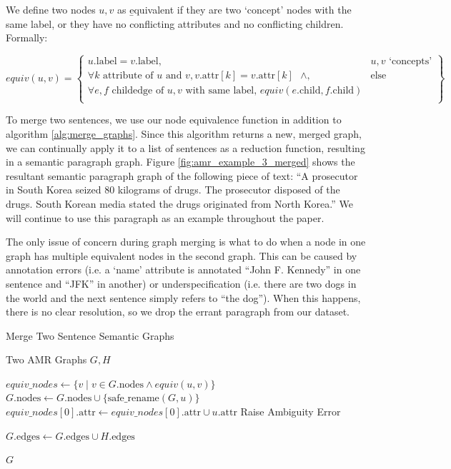 \documentclass[12pt]{article}
\begin{document}
We define two nodes $u, v$ as {\b equivalent} if they are two `concept' nodes with the same label, or they have no conflicting attributes and no conflicting children. Formally:

\[
    equiv(u,v) = \left\{\begin{array}{lr}
    u.\text{label} = v.\text{label}, & u,v \text{ `concepts'} \\
    \forall k \text{ attribute of } u \text{ and } v, v.\text{attr}[k] = v.\text{attr}[k] \text{ } \land, & \text{else} \\
    \forall e,f \text{ childedge of } u,v \text{ with same label, } equiv(e.\text{child}, f.\text{child}) & \\
    \end{array}\right\}
\]

To merge two sentences, we use our node equivalence function in addition to algorithm \ref{alg:merge_graphs}. Since this algorithm returns a new, merged graph, we can continually apply it to a list of sentences as a reduction function, resulting in a semantic paragraph graph. Figure \ref{fig:amr_example_3_merged} shows the resultant semantic paragraph graph of the following piece of text: ``A prosecutor in South Korea seized 80 kilograms of drugs. The prosecutor disposed of the drugs. South Korean media stated the drugs originated from North Korea.'' We will continue to use this paragraph as an example throughout the paper.

The only issue of concern during graph merging is what to do when a node in one graph has multiple equivalent nodes in the second graph. This can be caused by annotation errors (i.e. a `name' attribute is annotated ``John F. Kennedy'' in one sentence and ``JFK'' in another) or underspecification (i.e. there are two dogs in the world and the next sentence simply refers to ``the dog''). When this happens, there is no clear resolution, so we drop the errant paragraph from our dataset.

\begin{algorithm}
\caption{Merge Two Sentence Semantic Graphs}
\label{alg:merge_graphs}
\begin{algorithmic}[1]
\REQUIRE Two AMR Graphs $G, H$

    \STATE $equiv\_nodes \gets \{v \mid v \in G.\text{nodes} \land equiv(u,v)\}$
        \STATE $G.\text{nodes} \gets G.\text{nodes} \cup \{\text{safe\_rename}(G, u)\}$
        \STATE $equiv\_nodes[0].\text{attr} \gets equiv\_nodes[0].\text{attr} \cup u.\text{attr}$
    \ELSE
        \STATE Raise Ambiguity Error
    \ENDIF
\ENDFOR

\STATE $G.\text{edges} \gets G.\text{edges} \cup H.\text{edges}$

\RETURN $G$
\end{algorithmic}
\end{algorithm}
\end{document}
